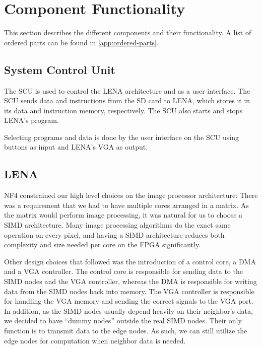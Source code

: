 \section{Component Functionality}

This section describes the different components and their functionality. A list
of ordered parts can be found in \ref{app:ordered-parts}.

\subsection{System Control Unit}

The \ac{SCU} is used to control the \ac{LENA} architecture and as a user
interface. The SCU sends data and instructions from the \ac{SD} card to
\ac{LENA}, which stores it in its data and instruction memory,
respectively. The \ac{SCU} also starts and stops \ac{LENA}'s program.

Selecting programs and data is done by the user interface on the \ac{SCU} using
buttons as input and \ac{LENA}'s VGA as output.

\subsection{LENA}

NF4 constrained our high level choices on the image processor architecture:
There was a requirement that we had to have multiple cores arranged in a
matrix. As the matrix would perform image processing, it was natural for us to
choose a \ac{SIMD} architecture. Many image processing algorithms do the exact
same operation on every pixel, and having a \ac{SIMD} architecture reduces both
complexity and size needed per core on the \ac{FPGA} significantly.

Other design choices that followed was the introduction of a control core, a
\ac{DMA} and a \ac{VGA} controller. The control core is responsible for sending
data to the \ac{SIMD} nodes and the \ac{VGA} controller, whereas the \ac{DMA} is
responsible for writing data from the \ac{SIMD} nodes back into memory. The
\ac{VGA} controller is responsible for handling the \ac{VGA} memory and sending
the correct signals to the \ac{VGA} port. In addition, as the \ac{SIMD} nodes
usually depend heavily on their neighbor's data, we decided to have ``dummy
nodes'' outside the real \ac{SIMD} nodes. Their only function is to transmit
data to the edge nodes. As such, we can still utilize the edge nodes for
computation when neighbor data is needed.
